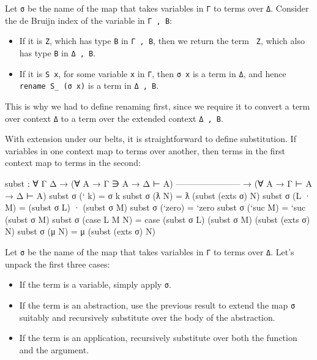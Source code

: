 Let \texttt{σ} be the name of the map that takes variables in \texttt{Γ}
to terms over \texttt{Δ}. Consider the de Bruijn index of the variable
in \texttt{Γ\ ,\ B}:

\begin{itemize}
\item
  If it is \texttt{Z}, which has type \texttt{B} in \texttt{Γ\ ,\ B},
  then we return the term \texttt{\textasciigrave{}\ Z}, which also has
  type \texttt{B} in \texttt{Δ\ ,\ B}.
\item
  If it is \texttt{S\ x}, for some variable \texttt{x} in \texttt{Γ},
  then \texttt{σ\ x} is a term in \texttt{Δ}, and hence
  \texttt{rename\ S\_\ (σ\ x)} is a term in \texttt{Δ\ ,\ B}.
\end{itemize}

This is why we had to define renaming first, since we require it to
convert a term over context \texttt{Δ} to a term over the extended
context \texttt{Δ\ ,\ B}.

With extension under our belts, it is straightforward to define
substitution. If variables in one context map to terms over another,
then terms in the first context map to terms in the second:

\begin{fence}
\begin{code}
subst : ∀ {Γ Δ}
  → (∀ {A} → Γ ∋ A → Δ ⊢ A)
    -----------------------
  → (∀ {A} → Γ ⊢ A → Δ ⊢ A)
subst σ (` k)          =  σ k
subst σ (ƛ N)          =  ƛ (subst (exts σ) N)
subst σ (L · M)        =  (subst σ L) · (subst σ M)
subst σ (`zero)        =  `zero
subst σ (`suc M)       =  `suc (subst σ M)
subst σ (case L M N)   =  case (subst σ L) (subst σ M) (subst (exts σ) N)
subst σ (μ N)          =  μ (subst (exts σ) N)
\end{code}
\end{fence}

Let \texttt{σ} be the name of the map that takes variables in \texttt{Γ}
to terms over \texttt{Δ}. Let's unpack the first three cases:

\begin{itemize}
\item
  If the term is a variable, simply apply \texttt{σ}.
\item
  If the term is an abstraction, use the previous result to extend the
  map \texttt{σ} suitably and recursively substitute over the body of
  the abstraction.
\item
  If the term is an application, recursively substitute over both the
  function and the argument.
\end{itemize}


